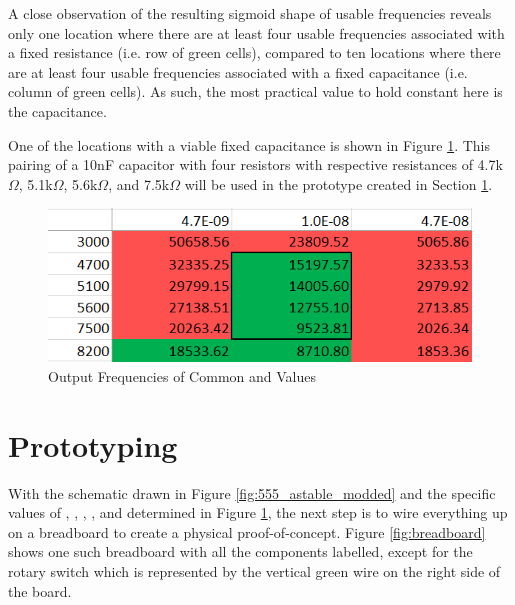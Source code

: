 A close observation of the resulting sigmoid shape of usable
frequencies reveals only one location where there are at least four
usable frequencies associated with a fixed resistance (i.e. row of
green cells), compared to ten locations where there are at least four
usable frequencies associated with a fixed capacitance (i.e. column of
green cells). As such, the most practical value to hold constant here
is the capacitance.

One of the locations with a viable fixed capacitance is shown in Figure
\ref{fig:freq-selection-r}. This pairing of a 10nF capacitor with four
resistors with respective resistances of 4.7k$\Omega$, 5.1k$\Omega$,
5.6k$\Omega$, and 7.5k$\Omega$ will be used in the prototype created in
Section \ref{sec:prototype}.

\begin{figure}[h]
    \centering
    \caption{Output Frequencies of Common  and  Values}
    \label{fig:freq-selection-r}
    \includegraphics[width=0.8\linewidth]{Figures/6 PCB Design/freq_selection_r.png}
\end{figure}


\section{Prototyping}
\label{sec:prototype}

With the schematic drawn in Figure \ref{fig:555_astable_modded} and the
specific values of , , , , and
 determined in Figure \ref{fig:freq-selection-r}, the next
step is to wire everything up on a breadboard to create a physical
proof-of-concept. Figure \ref{fig:breadboard} shows one such breadboard
with all the components labelled, except for the rotary switch which is
represented by the vertical green wire on the right side of the board.

